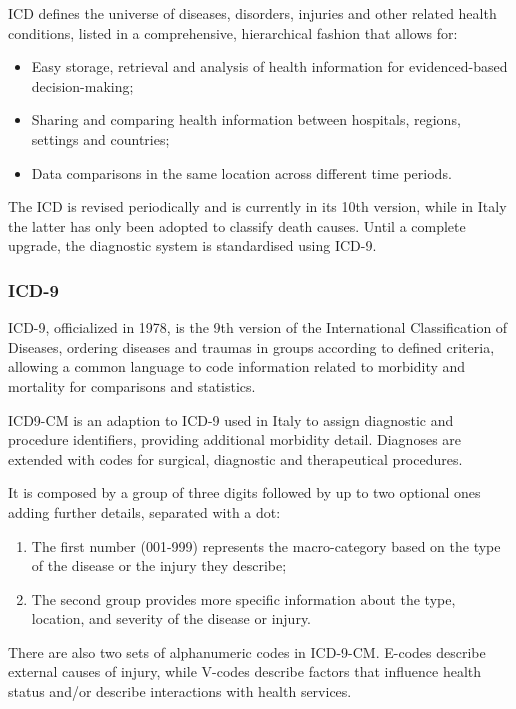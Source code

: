 ICD defines the universe of diseases, disorders, injuries and other related health conditions, listed in a comprehensive, hierarchical fashion that allows for: 
\begin{itemize}
	\item Easy storage, retrieval and analysis of health information for evidenced-based decision-making;
	\item Sharing and comparing health information between hospitals, regions, settings and countries;
	\item Data comparisons in the same location across different time periods\cite{who}.
\end{itemize}

The ICD is revised periodically and is currently in its 10th version, while in Italy the latter has only been adopted to classify death causes\cite{icdit}. Until a complete upgrade, the diagnostic system is standardised using ICD-9.

\subsubsection{ICD-9}
ICD-9, officialized in 1978, is the 9th version of the International Classification of Diseases, ordering diseases and traumas in groups according to defined criteria, allowing a common language to code information related to morbidity and mortality for comparisons and statistics\cite{icdit}.

ICD9-CM is an adaption to ICD-9 used in Italy to assign diagnostic and procedure identifiers, providing additional morbidity detail. Diagnoses are extended with codes for surgical, diagnostic and therapeutical procedures. 

It is composed by a group of three digits followed by up to two optional ones adding further details, separated with a dot:
\begin{enumerate}
	\item The first number (001-999) represents the macro-category based on the type of the disease or the injury they describe;
	\item The second group provides more specific information about the type, location, and severity of the disease or injury.
\end{enumerate}

There are also two sets of alphanumeric codes in ICD-9-CM. E-codes describe external causes of injury, while V-codes describe factors that influence health status and/or describe interactions with health services\cite{icd9en}.

